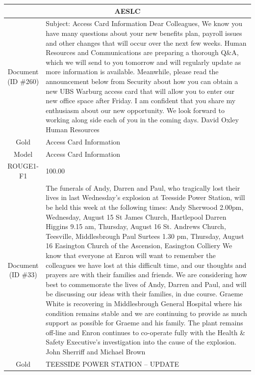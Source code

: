 \begin{table}[bth!]
\scriptsize
\centering
\renewcommand{\arraystretch}{1.3}
\begin{tabular}{c|p{}}
\hline
\multicolumn{2}{c}{AESLC} \\ \hline
\makecell{Document\\(ID \#260)} & 
Subject: Access Card Information Dear Colleagues, We know you have many questions about your new benefits plan, payroll issues and other changes that will occur over the next few weeks. Human Resources and Communications are preparing a thorough Q\&A, which we will send to you tomorrow and will regularly update as more information is available. Meanwhile, please read the announcement below from Security about how you can obtain a new UBS Warburg access card that will allow you to enter our new office space after Friday. I am confident that you share my enthusiasm about our new opportunity. We look forward to working along side each of you in the coming days. David Oxley Human Resources
\\ \hline
Gold & 
Access Card Information
\\ \hline
Model & 
Access Card Information
\\ \hline
ROUGE1-F1 & 
100.00
\\ \hline
\makecell{Document\\(ID \#33)} & 
The funerals of Andy, Darren and Paul, who tragically lost their lives in last Wednesday's explosion at Teesside Power Station, will be held this week at the following times: Andy Sherwood 2.00pm, Wednesday, August 15 St James Church, Hartlepool Darren Higgins 9.15 am, Thursday, August 16 St. Andrews Church, Teesville, Middlesbrough Paul Surtees 1.30 pm, Thursday, August 16 Easington Church of the Ascension, Easington Colliery We know that everyone at Enron will want to remember the colleagues we have lost at this difficult time, and our thoughts and prayers are with their families and friends. We are considering how best to commemorate the lives of Andy, Darren and Paul, and will be discussing our ideas with their families, in due course. Graeme White is recovering in Middlesbrough General Hospital where his condition remains stable and we are continuing to provide as much support as possible for Graeme and his family. The plant remains off-line and Enron continues to co-operate fully with the Health \& Safety Executive's investigation into the cause of the explosion. John Sherriff and Michael Brown
\\ \hline
Gold & 
TEESSIDE POWER STATION -- UPDATE

\end{tabular}
\end{table}
